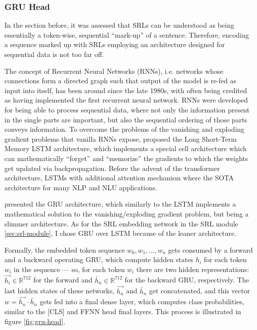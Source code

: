 \subsubsection{GRU Head}

In the section before, it was assessed that SRLs can be understood as being essentially a
token-wise, sequential ``mark-up'' of a sentence. Therefore, encoding a sequence marked up
with SRLs employing an architecture designed for sequential data is not too far off.


The concept of Recurrent Neural Networks (RNNs), i.e. networks whose connections form a directed
graph such that output of the model is re-fed as input into itself, has been around since the
late 1980s, with \citep{hopfield1982neural} often being credited as having implemented the first
recurrent neural network. RNNs were developed for being able to process sequential data, where
not only the information present in the single parts are important, but also the sequential
ordering of those parts conveys information. To overcome the problems of the vanishing and exploding gradient
problems that vanilla RNNs expose, \citep{hochreiter1997long} proposed the Long Short-Term
Memory LSTM architecture, which implements a special cell architecture which can mathematically
``forget'' and ``memorize'' the gradients to which the weights get updated via backpropagation.
Before the advent of the transformer architecture, LSTMs with additional attention mechanism
where the SOTA architecture for many NLP and NLU applications.

\cite{cho2014learning} presented the GRU architecture, which similarly to the LSTM
implements a mathematical solution to the vanishing/exploding gradient problem, but
being a slimmer architecture. As for the SRL embedding network in the SRL module
\ref{sec:srl-module}, I chose GRU over LSTM because of the leaner architecture.

Formally, the embedded token sequence $w_0, w_1, \dotso , w_n$ gets consumed by a
forward and a backward operating GRU, which compute hidden states $h_i$ for each token
$w_i$ in the sequence --- so, for each token $w_i$ there are two hidden representations:
$\overrightarrow{h_i} \in \mathbb{R}^{712}$ for the forward and $\overleftarrow{h_n} \in
\mathbb{R}^{712}$ for the backward GRU, respectively. The last hidden states of these
networks, $\overrightarrow{h_n}$ and $\overleftarrow{h_n}$ get concatenated, and this
vector $w = \overrightarrow{h_n} \cdot \overleftarrow{h_n}$ gets fed into a final dense
layer, which computes class probabilities, similar to the [CLS] and FFNN head final
layers. This
process is illustrated in figure \ref{fig:gru-head}.

